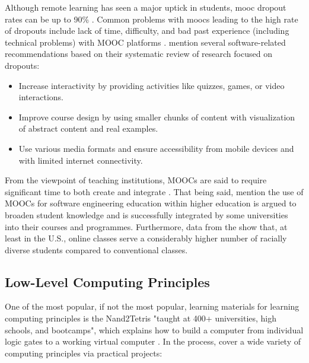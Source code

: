 Although remote learning has seen a major uptick in students, \gls{mooc} dropout rates can be up to 90\% \parencite{goopio_mooc_2021}.
Common problems with \glspl{mooc} leading to the high rate of dropouts include lack of time, difficulty, and bad past experience (including technical problems) with MOOC platforms \parencite{onah2014dropout}.
\textcite{goopio_mooc_2021} mention several software-related recommendations based on their systematic review of research focused on dropouts:

\begin{itemize}
    \item Increase interactivity by providing activities like quizzes, games, or video interactions.
    \item Improve course design by using smaller chunks of content with visualization of abstract content and real examples.
    \item Use various media formats and ensure accessibility from mobile devices and with limited internet connectivity.
\end{itemize}

From the viewpoint of teaching institutions, MOOCs are said to require significant time to both create and integrate \parencite{stikkolorum2014mooc}.
That being said, \textcite{stikkolorum2014mooc} mention the use of MOOCs for software engineering education within higher education is argued to broaden student knowledge and is successfully integrated by some universities into their courses and programmes.
Furthermore, data from the \textcite{us_doe_digest_2021} show that, at least in the U.S., online classes serve a considerably higher number of racially diverse students compared to conventional classes.

\subsection{Low-Level Computing Principles}
\label{sec:learning-principles}

One of the most popular, if not the most popular, learning materials for learning computing principles is the Nand2Tetris "taught at 400+ universities, high schools, and bootcamps", which explains how to build a computer from individual logic gates to a working virtual computer \parencite{nand2tetrisweb}.
In the process, \textcite{nand2tetris} cover a wide variety of computing principles via practical projects:

